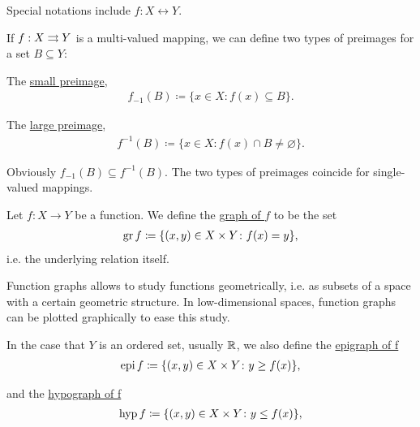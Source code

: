 \begin{definition}[Invertability]
\begin{itemize}
    Special notations include $f: X \longleftrightarrow Y$.
  \end{itemize}

  If $f : X \rightrightarrows Y$ is a multi-valued mapping, we can define two types of preimages for a set $B \subseteq Y$:
  \begin{defenum}
    \item The \uline{small preimage},
    \begin{align*}
      f_{-1}(B) \coloneqq \{ x \in X \colon f(x) \subseteq B \}.
    \end{align*}

    \item The \uline{large preimage},
    \begin{align*}
      f^{-1}(B) \coloneqq \{ x \in X \colon f(x) \cap B \neq \varnothing \}.
    \end{align*}
  \end{defenum}

  Obviously $f_{-1}(B) \subseteq f^{-1}(B)$. The two types of preimages coincide for single-valued mappings.
\end{definition}

\begin{definition}\label{def:function_graphs}
  Let $f: X \to Y$ be a function. We define the \uline{graph of $f$} to be the set
  \begin{align*}
    \operatorname{gr} f \coloneqq \{ (x, y) \in X \times Y \colon f(x) = y \},
  \end{align*}
  i.e. the underlying relation itself.

  Function graphs allows to study functions geometrically, i.e. as subsets of a space with a certain geometric structure. In low-dimensional spaces, function graphs can be plotted graphically to ease this study.

  In the case that $Y$ is an ordered set, usually $\mathbb{R}$, we also define the \uline{epigraph of f}
  \begin{align*}
    \operatorname{epi} f \coloneqq \{ (x, y) \in X \times Y \colon y \geq f(x) \},
  \end{align*}

  and the \uline{hypograph of f}
  \begin{align*}
    \operatorname{hyp} f \coloneqq \{ (x, y) \in X \times Y \colon y \leq f(x) \},
  \end{align*}
\end{definition}
